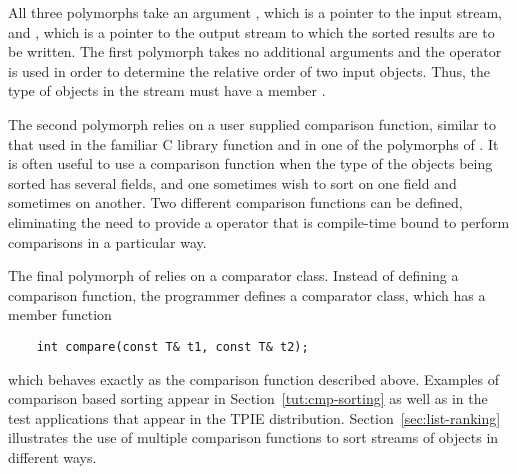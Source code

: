 All three polymorphs take an argument , which is a pointer
to the input stream, and , which is a pointer to the output
stream to which the sorted results are to be written. The first polymorph
takes no additional arguments and the \myverb{<} operator is used in order to
determine the relative order of two input objects. Thus, the type 
of objects in the stream must have a member .

The second polymorph relies on a user supplied comparison function, similar
to that used in the familiar C library function  and in one
of the polymorphs of . It is often useful to use a
comparison function when the type of the objects being sorted has several
fields, and one sometimes wish to sort on one field and sometimes on
another.  Two different comparison functions can be defined, eliminating
the need to provide a \myverb{<} operator that is compile-time bound to
perform comparisons in a particular way.

The final polymorph of  relies on a comparator
class.
Instead of defining a comparison function, the programmer defines a
comparator class, which has a member function
\begin{verbatim}
    int compare(const T& t1, const T& t2);
\end{verbatim}
which behaves exactly as the comparison function described above.
Examples of comparison based sorting appear in
Section~\ref{tut:cmp-sorting} as well as in the test applications that
appear in the TPIE distribution.  Section~\ref{sec:list-ranking}
illustrates the use of multiple comparison functions to sort streams of
objects in different ways.




